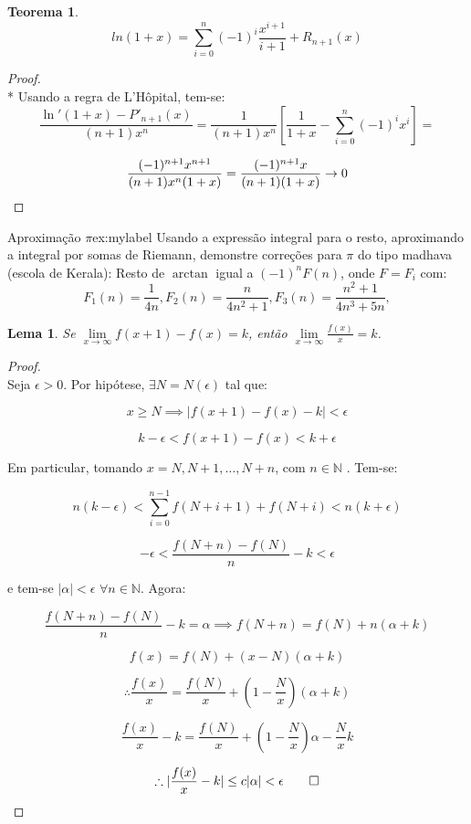 \documentclass{article}
\newtheorem*{theorem}{Teorema}
\newtheorem*{lemma}{Lema}
\begin{document}
\begin{theorem}
\[ ln(1+x) = \sum^n_{i=0}(-1)^i\frac{x^{i+1}}{i+1}+R_{n+1}(x) \]
\end{theorem}

\begin{proof}\mbox{}\\*
Usando a regra de L'Hôpital, tem-se: 
\[
\frac{\ln'(1+x) - P'_{n+1}(x)}{(n+1)x^n} = \frac{1}{(n+1)x^n}\left[\frac{1}{1+x} - \sum_{i=0}^{n}(-1)^ix^i\right] =
\]

\[
\frac{(-1)^{n+1}x^{n+1}}{(n+1)x^n(1+x)} = \frac{(-1)^{n+1}x}{(n+1)(1+x)} \rightarrow 0 \qedhere
\]
\end{proof}



\begin{exercise}{Aproximação $\pi$}{ex:mylabel}
Usando a expressão integral para o resto, aproximando a integral por somas de Riemann, demonstre correções para $\pi$ do tipo madhava (escola de Kerala): Resto de $\arctan$ igual a $(-1)^nF(n)$, onde $F=F_i$ com:
$$
F_1(n) = \frac{1}{4n},
F_2(n) = \frac{n}{4n^2+1},
F_3(n) = \frac{n^2 + 1}{4n^3+5n},
$$
\end{exercise}

\pagebreak

\begin{lemma}
Se $\lim\limits_{x \to \infty} f(x+1) - f(x) = k$, então $\lim\limits_{x \rightarrow \infty}\frac{f(x)}{x} = k$.
\end{lemma}

\begin{proof}\mbox{}\\
Seja $\epsilon > 0$. Por hipótese, $\exists N=N(\epsilon)$ tal que:

\[ 
x \geq N \implies |f(x+1) - f(x) -k| < \epsilon
\]

\[
k - \epsilon < f(x+1) - f(x) < k + \epsilon
\]

Em particular, tomando $x=N, N+1, \ldots, N+n$, com $n \in \mathbb{N}$
. Tem-se:

\[
  n(k - \epsilon) < \sum_{i=0}^{n-1}f(N+i+1) + f(N+i) < n(k+\epsilon)
\]

\[
  -\epsilon < \frac{f(N+n) - f(N)}{n} - k < \epsilon
\]

e tem-se $|\alpha|<\epsilon$ $\forall n \in \mathbb{N}$. Agora:

\[
\frac{f(N+n)-f(N)}{n}-k = \alpha \implies f(N+n) = f(N) + n(\alpha+k)
\]

\[
f(x) = f(N) + (x-N)(\alpha+k)
\]

\[
\therefore \frac{f(x)}{x} = \frac{f(N)}{x}+(1-\frac{N}{x})(\alpha+k)
\]

\[
\frac{f(x)}{x}-k = \frac{f(N)}{x} + (1 - \frac{N}{x})\alpha - \frac{N}{x}k
\]

\[
\therefore |\frac{f(x)}{x} - k| \le c |\alpha| < \epsilon \qed
\]

\end{proof}
\end{document}
